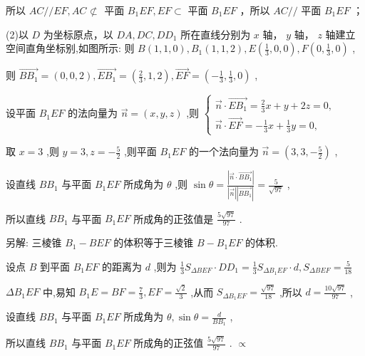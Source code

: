\documentclass[10pt]{article}
\begin{document}
所以 \({AC}//{EF},{AC} \text{ ⊄ }\) 平面 \({B}_{1}{EF},{EF} \subset\) 平面 \({B}_{1}{EF}\) ，所以 \({AC}//\) 平面 \({B}_{1}{EF}\) ；

(2)以 \(D\) 为坐标原点，以 \({DA},{DC},{D{D}_{1}}\) 所在直线分别为 \(x\) 轴， \(y\) 轴， \(z\) 轴建立空间直角坐标别,如图所示: 则 \(B\left( {1,1,0}\right) ,{B}_{1}\left( {1,1,2}\right) ,E\left( {\frac{1}{3},0,0}\right) ,F\left( {0,\frac{1}{3},0}\right)\) ,

则 \(\overrightarrow{B{B}_{1}} = \left( {0,0,2}\right) ,\overrightarrow{E{B}_{1}} = \left( {\frac{2}{3},1,2}\right) ,\overrightarrow{EF} = \left( {-\frac{1}{3},\frac{1}{3},0}\right)\) ,

设平面 \({B}_{1}{EF}\) 的法向量为 \(\overrightarrow{n} = \left( {x,y,z}\right)\) ,则 \(\left\{  \begin{matrix} \overrightarrow{n} \cdot  \overrightarrow{E{B}_{1}} = \frac{2}{3}x + y + {2z} = 0, \\  \overrightarrow{n} \cdot  \overrightarrow{EF} =  - \frac{1}{3}x + \frac{1}{3}y = 0, \end{matrix}\right.\)

取 \(x = 3\) ,则 \(y = 3,z =  - \frac{5}{2}\) ,则平面 \({B}_{1}{EF}\) 的一个法向量为 \(\overrightarrow{n} = \left( {3,3, - \frac{5}{2}}\right)\) ,

设直线 \(B{B}_{1}\) 与平面 \({B}_{1}{EF}\) 所成角为 \(\theta\) ,则 \(\sin \theta  = \frac{\left| \overrightarrow{n} \cdot  \overrightarrow{B{B}_{1}}\right| }{\left| \overrightarrow{n}\right| \left| \overrightarrow{B{B}_{1}}\right| } = \frac{5}{\sqrt{97}}\) ,

所以直线 \(B{B}_{1}\) 与平面 \({B}_{1}{EF}\) 所成角的正弦值是 \(\frac{5\sqrt{97}}{97}\) .

另解: 三棱锥 \({B}_{1} - {BEF}\) 的体积等于三棱锥 \(B - {B}_{1}{EF}\) 的体积.

设点 \(B\) 到平面 \({B}_{1}{EF}\) 的距离为 \(d\) ,则为 \(\frac{1}{3}{S}_{\Delta BEF} \cdot  D{D}_{1} = \frac{1}{3}{S}_{\Delta {B}_{1}{EF}} \cdot  d,{S}_{\Delta BEF} = \frac{5}{18}\)

\(\Delta {B}_{1}{EF}\) 中,易知 \({B}_{1}E = {BF} = \frac{7}{3},{EF} = \frac{\sqrt{2}}{3}\) ,从而 \({S}_{\Delta {B}_{1}{EF}} = \frac{\sqrt{97}}{18}\) ,所以 \(d = \frac{{10}\sqrt{97}}{97}\) ,

设直线 \(B{B}_{1}\) 与平面 \({B}_{1}{EF}\) 所成角为 \(\theta ,\sin \theta  = \frac{d}{B{B}_{1}}\) ,

所以直线 \(B{B}_{1}\) 与平面 \({B}_{1}{EF}\) 所成角的正弦值 \(\frac{5\sqrt{97}}{97}\) . \(\propto\)
\end{document}
